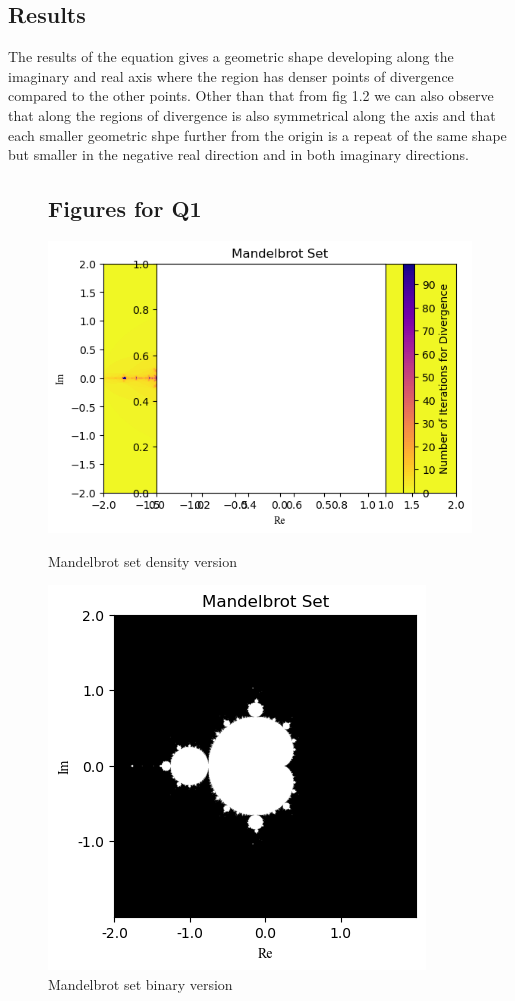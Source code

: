 \documentclass{article}
\begin{document}
\subsection{Results}
The results of the equation gives a geometric shape developing along the imaginary and real axis where the region has denser points of divergence compared to the other points. Other than that from fig 1.2 we can also observe that along the regions of divergence is also symmetrical along the axis and that each smaller geometric shpe further from the origin is a repeat of the same shape but smaller in the negative real direction and in both imaginary directions.
\newpage
\begin{figure}
\subsection{Figures for Q1}
    \centering
    \includegraphics[]{mandelbrot2.png}
    \caption{Mandelbrot set density version}
    \label{fig:1}
    \includegraphics[]{mandlebrot1.png}
    \caption{Mandelbrot set binary version}
    \label{fig:2}
\end{figure}
\newpage
\end{document}
